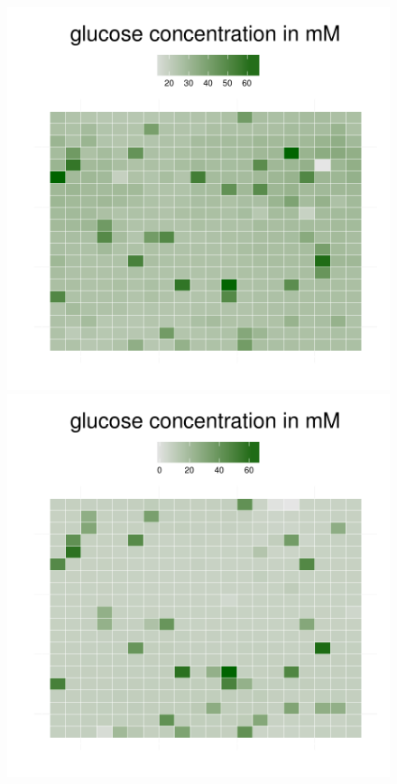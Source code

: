 \begin{figure}[h]
{\begin{minipage}[t]{0.3\textwidth}
  \end{minipage}
  \begin{minipage}[t]{0.3\textwidth}
    \includegraphics[width=\textwidth]{../results/barkeri_ecoli_20x20_seed4612_gluc100.pdf}
  \end{minipage}
  \begin{minipage}[t]{0.3\textwidth}
    \includegraphics[width=\textwidth]{../results/barkeri_ecoli_20x20_seed4612_gluc150.pdf}

\end{minipage}}
\end{figure}
